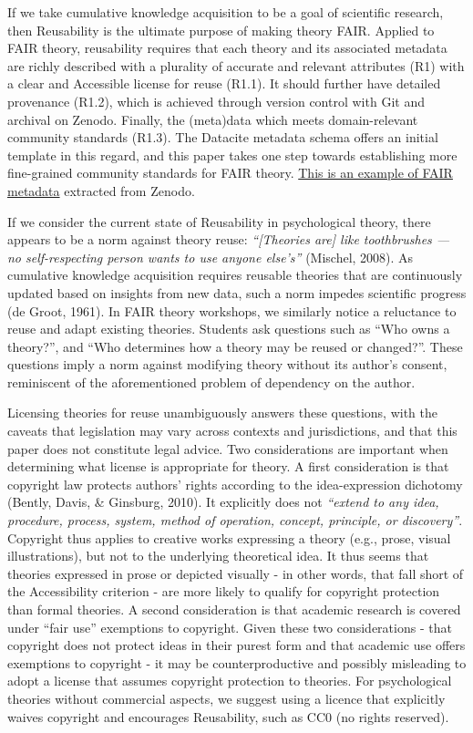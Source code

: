 \documentclass[
  man, noextraspace,floatsintext]{apa6}
\begin{document}
If we take cumulative knowledge acquisition to be a goal of scientific research, then Reusability is the ultimate purpose of making theory FAIR.
Applied to FAIR theory, reusability requires that each theory and its associated metadata are richly described with a plurality of accurate and relevant attributes (R1) with a clear and Accessible license for reuse (R1.1).
It should further have detailed provenance (R1.2),
which is achieved through version control with Git and archival on Zenodo.
Finally, the (meta)data which meets domain-relevant community standards (R1.3).
The Datacite metadata schema offers an initial template in this regard,
and this paper takes one step towards establishing more fine-grained community standards for FAIR theory.
\href{https://raw.githubusercontent.com/cjvanlissa/fair_theory/refs/heads/main/example_metadata.json}{This is an example of FAIR metadata} extracted from Zenodo.

If we consider the current state of Reusability in psychological theory, there appears to be a norm against theory reuse:
\emph{``{[}Theories are{]} like toothbrushes --- no self-respecting person wants to use anyone else's''} (Mischel, 2008).
As cumulative knowledge acquisition requires reusable theories that are continuously updated based on insights from new data, such a norm impedes scientific progress (de Groot, 1961).
In FAIR theory workshops, we similarly notice a reluctance to reuse and adapt existing theories.
Students ask questions such as ``Who owns a theory?'',
and ``Who determines how a theory may be reused or changed?''.
These questions imply a norm against modifying theory without its author's consent, reminiscent of the aforementioned problem of dependency on the author.

Licensing theories for reuse unambiguously answers these questions,
with the caveats that legislation may vary across contexts and jurisdictions, and that this paper does not constitute legal advice.
Two considerations are important when determining what license is appropriate for theory.
A first consideration is that copyright law protects authors' rights according to the idea-expression dichotomy (Bently, Davis, \& Ginsburg, 2010).
It explicitly does not
\emph{``extend to any idea, procedure, process, system, method of operation, concept, principle, or discovery''}.
Copyright thus applies to creative works expressing a theory (e.g., prose, visual illustrations),
but not to the underlying theoretical idea.
It thus seems that theories expressed in prose or depicted visually - in other words, that fall short of the Accessibility criterion - are more likely to qualify for copyright protection than formal theories.
A second consideration is that academic research is covered under ``fair use'' exemptions to copyright.
Given these two considerations - that copyright does not protect ideas in their purest form and that academic use offers exemptions to copyright - it may be counterproductive and possibly misleading to adopt a license that assumes copyright protection to theories.
For psychological theories without commercial aspects, we suggest using a licence that explicitly waives copyright and encourages Reusability,
such as CC0 (no rights reserved).
\end{document}
